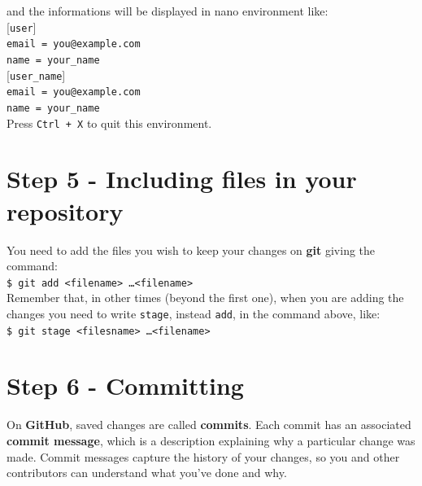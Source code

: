 \documentclass[12pt,a4paper,titlepage,brazil]{article}
\begin{document}
{and the informations will be displayed in nano environment like:\\

[\texttt{user}]\\
  
\quad  \texttt{email = you@example.com}\\
  
\quad  \texttt{name = your\_name}\\
  
[\texttt{user\_name}]\\
  
\quad  \texttt{email = you@example.com}\\
  
\quad  \texttt{name = your\_name}\\
  
Press \texttt{Ctrl + X} to quit this environment.


\section{Step 5 - Including files in your repository}

You need to add the files you wish to keep your changes on {\bf git} giving the command:\\

\texttt{\$ git add <filename> \dots <filename>}\\

Remember that, in other times (beyond the first one), when you are adding the changes you need to write \texttt{stage}, instead \texttt{add}, in the command above, like:\\

\texttt{\$ git stage <filesname> \dots <filename>}


\section{Step 6 - Committing}

On {\bf GitHub}, saved changes are called {\bf commits}. Each commit has an associated {\bf commit message}, which is a description explaining why a particular change was made. Commit messages capture the history of your changes, so you and other contributors can understand what you’ve done and why.\\

}
\end{document}
